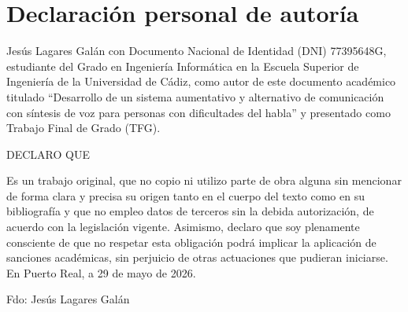\newpage{\ }
\thispagestyle{empty}

\clearpage\setcounter{page}{-1} %

\chapter*{Declaración personal de autoría}

\vspace{15mm}

\noindent Jesús Lagares Galán con Documento Nacional de Identidad (DNI) 77395648G, estudiante del Grado en Ingeniería Informática en la Escuela Superior de Ingeniería de la Universidad de Cádiz, como autor de este documento académico titulado ``Desarrollo de un sistema aumentativo y alternativo de comunicación con síntesis de voz para personas con dificultades del habla'' y presentado como Trabajo Final de Grado (TFG).


\vspace{15mm}


DECLARO QUE \\
\vspace{1mm}

\noindent Es un trabajo original, que no copio ni utilizo parte de obra alguna sin mencionar de forma clara y precisa su origen tanto en el cuerpo del texto como en su bibliografía y que no empleo datos de terceros sin la debida autorización, de acuerdo con la legislación vigente. Asimismo, declaro que soy plenamente consciente de que no respetar esta obligación podrá implicar  la  aplicación de sanciones académicas, sin perjuicio de otras actuaciones que pudieran iniciarse.
En Puerto Real, a 29 de mayo de 2026.


\vspace{15mm}
Fdo: Jesús Lagares Galán\hspace{10cm}
